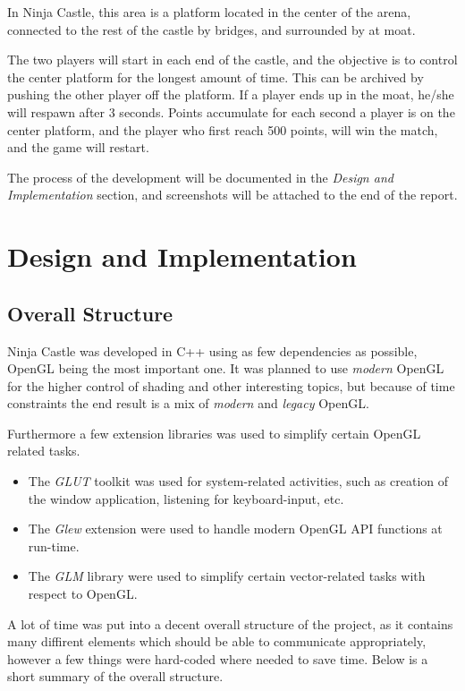 \documentclass[12pt,a4paper,titlepage]{article}
\begin{document}
In Ninja Castle, this area is a platform located in the center of the arena,
connected to the rest of the castle by bridges, and surrounded by at moat.

The two players will start in each end of the castle, and the objective is to
control the center platform for the longest amount of time. This can be
archived by pushing the other player off the platform. If a player ends up in
the moat, he/she will respawn after 3 seconds. Points accumulate for each
second a player is on the center platform, and the player who first reach 500
points, will win the match, and the game will restart.

The process of the development will be documented in the \emph{Design and
Implementation} section, and screenshots will be attached to the end of the
report.

\section{Design and Implementation}
\label{sec-2}
\subsection*{Overall Structure}
\label{sec-2-1}
Ninja Castle was developed in C++ using as few dependencies as possible,
OpenGL being the most important one. It was planned to use \emph{modern} OpenGL
for the higher control of shading and other interesting topics, but because
of time constraints the end result is a mix of \emph{modern} and \emph{legacy} OpenGL.

Furthermore a few extension libraries was used to simplify certain OpenGL
related tasks.

\begin{itemize}
\item The \emph{GLUT} toolkit was used for system-related activities, such as creation
of the window application, listening for keyboard-input, etc.
\item The \emph{Glew} extension were used to handle modern OpenGL API functions at run-time.
\item The \emph{GLM} library were used to simplify certain vector-related tasks with
respect to OpenGL.
\end{itemize}

A lot of time was put into a decent overall structure of the project, as it
contains many diffirent elements which should be able to communicate
appropriately, however a few things were hard-coded where needed to save
time. Below is a short summary of the overall structure.
\end{document}
